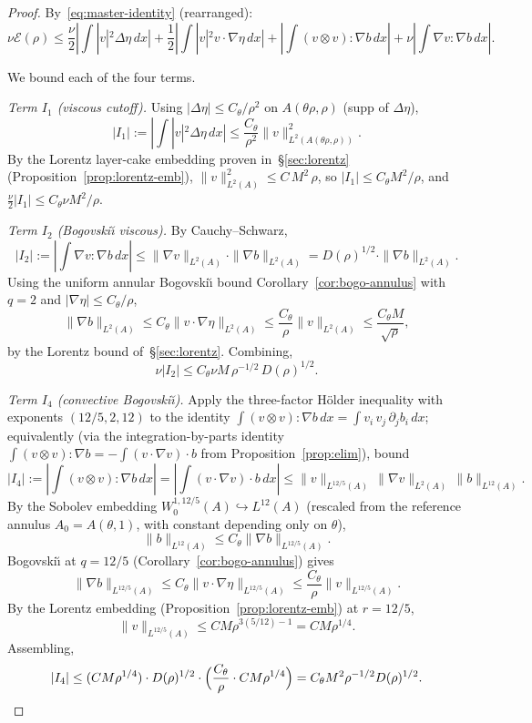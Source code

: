 \documentclass[11pt]{amsart}
\theoremstyle{definition}
\newcommand{\EE}{\mathcal{E}}    %
\newcommand{\DD}{D}              %
\newcommand{\norm}[1]{\|#1\|}
\newcommand{\abs}[1]{|#1|}
\begin{document}
\begin{proof}
By~\eqref{eq:master-identity} (rearranged):
\[
\nu \EE(\rho) \leq \frac{\nu}{2}\abs{\int \abs{v}^2 \Delta\eta\, dx}
+ \frac{1}{2}\abs{\int\abs{v}^2 v \cdot \nabla\eta\, dx}
+ \abs{\int (v\otimes v) : \nabla b\, dx}
+ \nu \abs{\int \nabla v : \nabla b\, dx}.
\]

We bound each of the four terms.

\emph{Term $I_1$ (viscous cutoff).} Using $\abs{\Delta\eta} \leq
C_\theta/\rho^2$ on $A(\theta\rho, \rho)$ (supp of $\Delta\eta$),
\[
\abs{I_1} := \abs{\int \abs{v}^2 \Delta\eta\, dx}
\leq \frac{C_\theta}{\rho^2} \norm{v}_{L^2(A(\theta\rho, \rho))}^2.
\]
By the Lorentz layer-cake embedding proven in~\S\ref{sec:lorentz}
(Proposition~\ref{prop:lorentz-emb}), $\norm{v}_{L^2(A)}^2 \leq
C\,M^2\,\rho$, so
$\abs{I_1} \leq C_\theta M^2 / \rho$, and
$\frac{\nu}{2}\abs{I_1} \leq C_\theta \nu M^2/\rho$.

\emph{Term $I_2$ (Bogovski\u{\i} viscous).} By Cauchy--Schwarz,
\[
\abs{I_2} := \abs{\int \nabla v : \nabla b\, dx}
\leq \norm{\nabla v}_{L^2(A)} \cdot \norm{\nabla b}_{L^2(A)}
= \DD(\rho)^{1/2} \cdot \norm{\nabla b}_{L^2(A)}.
\]
Using the uniform annular Bogovski\u{\i} bound
Corollary~\ref{cor:bogo-annulus} with $q = 2$ and
$\abs{\nabla \eta} \leq C_\theta/\rho$,
\[
\norm{\nabla b}_{L^2(A)} \leq C_\theta \norm{v \cdot \nabla \eta}_{L^2(A)}
\leq \frac{C_\theta}{\rho} \norm{v}_{L^2(A)}
\leq \frac{C_\theta M}{\sqrt{\rho}},
\]
by the Lorentz bound of~\S\ref{sec:lorentz}. Combining,
\[
\nu \abs{I_2} \leq C_\theta \nu M\, \rho^{-1/2}\,\DD(\rho)^{1/2}.
\]

\emph{Term $I_4$ (convective Bogovski\u{\i}).} Apply the
three-factor H\"older inequality with exponents $(12/5, 2, 12)$
to the identity $\int (v\otimes v):\nabla b\, dx =
\int v_i\,v_j\,\partial_j b_i\, dx$; equivalently (via the
integration-by-parts identity $\int (v\otimes v):\nabla b =
-\int (v \cdot \nabla v)\cdot b$ from
Proposition~\ref{prop:elim}), bound
\[
\abs{I_4} := \abs{\int (v \otimes v) : \nabla b\, dx}
= \abs{\int (v \cdot \nabla v) \cdot b\, dx}
\leq \norm{v}_{L^{12/5}(A)}\,\norm{\nabla v}_{L^2(A)}\,\norm{b}_{L^{12}(A)}.
\]
By the Sobolev embedding
$W^{1,12/5}_0(A) \hookrightarrow L^{12}(A)$ (rescaled from the
reference annulus $A_0 = A(\theta, 1)$, with constant depending
only on $\theta$),
\[
\norm{b}_{L^{12}(A)} \leq C_\theta \norm{\nabla b}_{L^{12/5}(A)}.
\]
Bogovski\u{\i} at $q = 12/5$ (Corollary~\ref{cor:bogo-annulus})
gives
\[
\norm{\nabla b}_{L^{12/5}(A)} \leq C_\theta \norm{v \cdot \nabla \eta}_{L^{12/5}(A)}
\leq \frac{C_\theta}{\rho} \norm{v}_{L^{12/5}(A)}.
\]
By the Lorentz embedding (Proposition~\ref{prop:lorentz-emb})
at $r = 12/5$,
\[
\norm{v}_{L^{12/5}(A)} \leq C M \rho^{3(5/12) - 1} = C M \rho^{1/4}.
\]
Assembling,
\[
\abs{I_4} \leq (C M \rho^{1/4}) \cdot \DD(\rho)^{1/2} \cdot
\Bigl(\frac{C_\theta}{\rho} \cdot C M \rho^{1/4}\Bigr)
= C_\theta M^2 \rho^{-1/2} \DD(\rho)^{1/2}.
\]


\end{proof}
\end{document}
